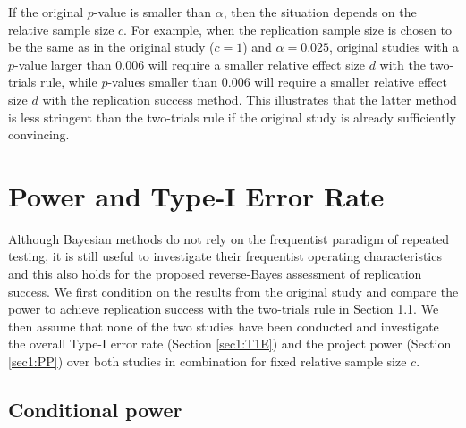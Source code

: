 If the original $p$-value is smaller than $\alpha$, then the situation depends
on the relative sample size $c$. For example, when the replication sample size
is chosen to be the same as in the original study ($c=1$) and $\alpha=0.025$,
original studies with a $p$-value larger than $0.006$ will require a smaller
relative effect size $d$ with the two-trials rule, while $p$-values smaller than
$0.006$ will require a smaller relative effect size $d$ with the replication
success method. This illustrates that the latter method is less stringent than
the two-trials rule if the original study is already sufficiently convincing.

\section{Power and Type-I Error Rate}\label{sec1:ER}
Although Bayesian methods do not rely on the frequentist paradigm of repeated
testing, it is still useful to investigate their frequentist operating
characteristics \citep{Dawid1982, Rubin1984, Grieve2016} and this also holds for
the proposed reverse-Bayes assessment of replication success. We first condition
on the results from the original study and compare the power to achieve
replication success with the two-trials rule in Section \ref{sec1:powerrep}. We
then assume that none of the two studies have been conducted and investigate the
overall Type-I error rate (Section \ref{sec1:T1E}) and the project power (Section
\ref{sec1:PP}) \citep{Maca2002} over both studies in combination for fixed
relative sample size $c$.

\subsection{Conditional power}\label{sec1:powerrep}


